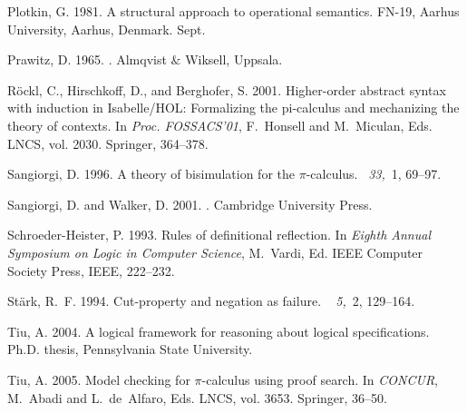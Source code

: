 \documentclass{acmtrans2m}
\begin{document}
\begin{thebibliography}{}
{\sc Plotkin, G.} 1981.
\newblock A structural approach to operational semantics.
 {FN}-19, Aarhus University, Aarhus, Denmark. Sept.

{\sc Prawitz, D.} 1965.
.
\newblock Almqvist $\&$ Wiksell, Uppsala.

{\sc R{\"o}ckl, C.}, {\sc Hirschkoff, D.}, {\sc and} {\sc Berghofer, S.} 2001.
\newblock Higher-order abstract syntax with induction in {Isabelle/HOL}:
  Formalizing the pi-calculus and mechanizing the theory of contexts.
\newblock In {\em Proc. FOSSACS'01}, {F.~Honsell} {and} {M.~Miculan}, Eds.
  LNCS, vol. 2030. Springer, 364--378.

{\sc Sangiorgi, D.} 1996.
\newblock A theory of bisimulation for the $\pi$-calculus.
~{\em 33,\/}~1, 69--97.

{\sc Sangiorgi, D.} {\sc and} {\sc Walker, D.} 2001.
.
\newblock Cambridge University Press.

{\sc Schroeder-Heister, P.} 1993.
\newblock Rules of definitional reflection.
\newblock In {\em Eighth {Annual Symposium on Logic in Computer Science}},
  {M.~Vardi}, Ed. IEEE Computer Society Press, IEEE, 222--232.

{\sc St{\"a}rk, R.~F.} 1994.
\newblock Cut-property and negation as failure.
~{\em
  5,\/}~2, 129--164.

{\sc Tiu, A.} 2004.
\newblock A logical framework for reasoning about logical specifications.
\newblock Ph.D. thesis, Pennsylvania State University.

{\sc Tiu, A.} 2005.
\newblock Model checking for $\pi$-calculus using proof search.
\newblock In {\em CONCUR}, {M.~Abadi} {and} {L.~de~Alfaro}, Eds. LNCS, vol.
  3653. Springer, 36--50.


\end{thebibliography}
\end{document}
